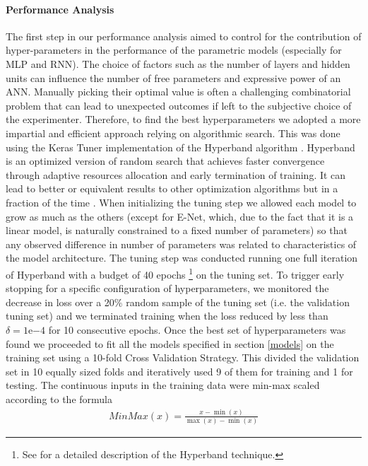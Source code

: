 \paragraph{\textbf{Performance Analysis}} 
\label{perf_analysis}
The first step in our performance analysis aimed to control for the contribution of hyper-parameters in the performance of the parametric models (especially for MLP and RNN). The choice of factors such as the number of layers and hidden units can influence the number of free parameters and expressive power of an ANN. Manually picking their optimal value is often a challenging combinatorial problem that can lead to unexpected outcomes if left to the subjective choice of the experimenter. Therefore, to find the best hyperparameters we adopted a more impartial and efficient approach relying on algorithmic search. This was done using the Keras Tuner implementation \cite{omalley2019kerastuner} of the Hyperband algorithm \cite{li2017hyperband}. Hyperband is an optimized version of random search that achieves faster convergence through adaptive resources allocation and early termination of training. It can lead to better or equivalent results to other optimization algorithms but in a fraction of the time \cite{li2017hyperband}. When initializing the tuning step we allowed each model to grow as much as the others (except for E-Net, which,  due to the fact that it is a linear model, is naturally constrained to a fixed number of parameters) so that any observed difference in number of parameters was related to characteristics of the model architecture. The tuning step was conducted running one full iteration of Hyperband with a budget of 40 epochs \footnote{See  \cite{li2017hyperband,hyperwebs} for a detailed description of the Hyperband technique.} on the tuning set. To trigger early stopping for a specific configuration of hyperparameters, we monitored the decrease in loss over a 20\% random sample of the tuning set (i.e. the validation tuning set) and we terminated training when the loss reduced by less than $\delta = 1\mathrm{e}{-4}$ for 10 consecutive epochs. Once the best set of hyperparameters was found we proceeded to fit all the models specified in section \ref{models} on the training set using a 10-fold Cross Validation Strategy. This  divided the validation set in 10 equally sized folds and iteratively used 9 of them for training and 1 for testing. The continuous inputs in the training data were min-max scaled according to the formula
\begin{equation}
  \begin{gathered} 
  \label{min_max}
        MinMax(x) =\frac{x - \min(x)} {\max(x) - \min(x)} 
  \end{gathered}
\end{equation}
